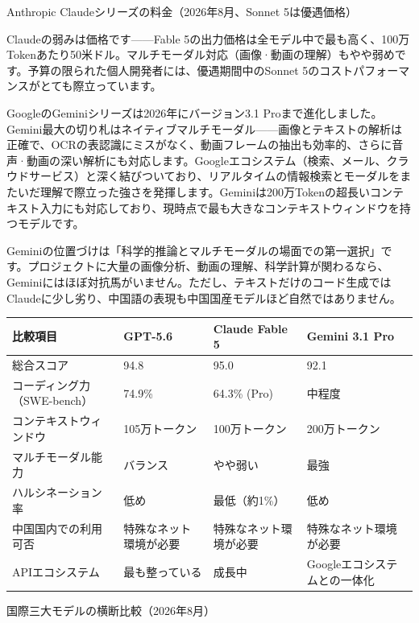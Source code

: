\begin{center}\small\color{gray}Anthropic Claudeシリーズの料金（2026年8月、Sonnet 5は優遇価格）\end{center}

Claudeの弱みは価格です——Fable 5の出力価格は全モデル中で最も高く、100万Tokenあたり50米ドル。マルチモーダル対応（画像·動画の理解）もやや弱めです。予算の限られた個人開発者には、優遇期間中のSonnet 5のコストパフォーマンスがとても際立っています。


GoogleのGeminiシリーズは2026年にバージョン3.1 Proまで進化しました。Gemini最大の切り札はネイティブマルチモーダル——画像とテキストの解析は正確で、OCRの表認識にミスがなく、動画フレームの抽出も効率的、さらに音声·動画の深い解析にも対応します。Googleエコシステム（検索、メール、クラウドサービス）と深く結びついており、リアルタイムの情報検索とモーダルをまたいだ理解で際立った強さを発揮します。Geminiは200万Tokenの超長いコンテキスト入力にも対応しており、現時点で最も大きなコンテキストウィンドウを持つモデルです。

Geminiの位置づけは「科学的推論とマルチモーダルの場面での第一選択」です。プロジェクトに大量の画像分析、動画の理解、科学計算が関わるなら、Geminiにはほぼ対抗馬がいません。ただし、テキストだけのコード生成ではClaudeに少し劣り、中国語の表現も中国国産モデルほど自然ではありません。

\begin{center}
\begin{tabularx}{\linewidth}{|X|X|X|X|}
\hline
\textbf{比較項目} & \textbf{GPT-5.6} & \textbf{Claude Fable 5} & \textbf{Gemini 3.1 Pro} \tabularnewline
\hline
総合スコア & 94.8 & 95.0 & 92.1 \tabularnewline
コーディング力（SWE-bench） & 74.9\% & 64.3\% (Pro) & 中程度 \tabularnewline
コンテキストウィンドウ & 105万トークン & 100万トークン & 200万トークン \tabularnewline
マルチモーダル能力 & バランス & やや弱い & 最強 \tabularnewline
ハルシネーション率 & 低め & 最低（約1\%） & 低め \tabularnewline
中国国内での利用可否 & 特殊なネット環境が必要 & 特殊なネット環境が必要 & 特殊なネット環境が必要 \tabularnewline
APIエコシステム & 最も整っている & 成長中 & Googleエコシステムとの一体化 \tabularnewline
\hline
\end{tabularx}
\end{center}

\begin{center}\small\color{gray}国際三大モデルの横断比較（2026年8月）\end{center}

